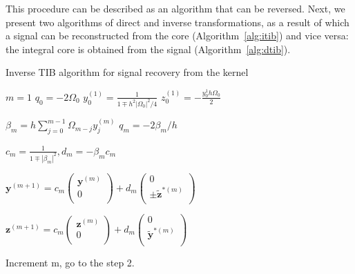 This procedure can be described as an algorithm that can be reversed. Next, we present two algorithms of direct and inverse transformations, as a result of which a signal can be reconstructed from the core (Algorithm~\ref{alg:itib}) and vice versa: the integral core is obtained from the signal (Algorithm~\ref{alg:dtib}).
\begin{algorithm}
    \caption{Inverse TIB algorithm for signal recovery from the kernel}
\label{alg:itib}
\begin{algorithmic}[1]

    \State $ m = 1 $ 
    $q_0 = -2\Omega_0 $
    $y_0^{(1)} = \frac{1}{1 \mp h^2 |\Omega_0|^2 / 4}$
    $ z_0^{(1)} = -\frac{y_0^{1} h \Omega_0}{2}$
    
    \State $ \beta_m = h \sum_{j=0}^{m-1}\Omega_{m-j} y_{j}^{(m)} $
    \State $ q_m = -2 \beta_m / h $

	\State $c_m = \frac{1}{1 \mp |\beta_m|^2}, d_m = -\beta_m c_m$

	\State $\mathbf y^{(m+1)} = 
		c_m \begin{pmatrix} \mathbf y^{(m)} \\ 0 \\ \end{pmatrix} +
		d_m \begin{pmatrix} 0 \\ \pm \mathbf{\tilde z}^{*(m)} \\ \end{pmatrix}$

	\State $\mathbf z^{(m+1)} = 
		c_m \begin{pmatrix} \mathbf z^{(m)} \\ 0 \\ \end{pmatrix} +
		d_m \begin{pmatrix} 0 \\ \mathbf{ \tilde y}^{*(m)} \\ \end{pmatrix}$

	\State Increment m, go to the step 2.

\end{algorithmic}
\end{algorithm}


